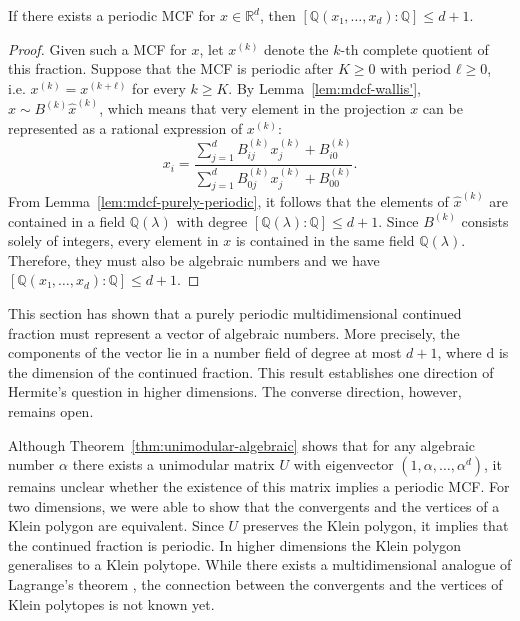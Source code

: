 \begin{theorem}
  \label{thm:mdcf-periodic}
  If there exists a periodic MCF for $x ∈ ℝ^d$,
  then $[ℚ(x₁, …, x_d) : ℚ] ≤ d + 1$.
\end{theorem}

\begin{proof}
  Given such a MCF for $x$, let $x^{(k)}$ denote the $k$-th complete quotient
  of this fraction.
  Suppose that the MCF is periodic after $K ≥ 0$ with period $ℓ ≥ 0$, i.e.
  $x^{(k)} = x^{(k+ℓ)}$ for every $k ≥ K$.
  By Lemma~\ref{lem:mdcf-wallis'}, $\hat x \sim B^{(k)} \hat x^{(k)}$,
  which means that very element in the projection $x$ can be represented
  as a rational expression of $x^{(k)}$:
  \[
    x_i = \frac{∑_{j=1}^d B_{ij}^{(k)} x_j^{(k)} + B_{i0}^{(k)}}{\sum_{j=1}^d B_{0j}^{(k)} x_j^{(k)} + B_{00}^{(k)}}.
  \]
  From Lemma~\ref{lem:mdcf-purely-periodic},
  it follows that the elements of $\hat x^{(k)}$
  are contained in a field $ℚ(λ)$ with degree $[ℚ(λ) : ℚ] ≤ d+1$.
  Since $B^{(k)}$ consists solely of integers, every element in $x$ is contained in the same field $ℚ(λ)$.
  Therefore, they must also be algebraic numbers
  and we have $[ℚ(x₁, …, x_d) : ℚ] ≤ d+1$.
\end{proof}

This section has shown that a purely periodic multidimensional continued fraction must represent a vector of algebraic numbers.
More precisely, the components of the vector lie in a number field of degree at
most $d + 1$, where d is the dimension of the continued fraction.
This result establishes one direction of Hermite's question in higher dimensions.
The converse direction, however, remains open.

Although Theorem~\ref{thm:unimodular-algebraic} shows that for any algebraic
number $α$ there exists a unimodular matrix $U$ with eigenvector $(1, α, …, α^d)$,
it remains unclear whether the existence of this matrix implies a periodic MCF.
For two dimensions, we were able to show that the convergents and the vertices of a Klein polygon are equivalent.
Since $U$ preserves the Klein polygon, it implies that the continued fraction is periodic.
In higher dimensions the Klein polygon generalises to a Klein polytope.
While there exists a multidimensional analogue of Lagrange's theorem \cite{German08},
the connection between the convergents and the vertices of Klein polytopes is not known yet.
